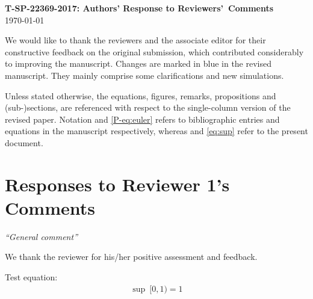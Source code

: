 \documentclass[11pt]{article}
\begin{document}
\begin{center}
\Large \textbf{T-SP-22369-2017: Authors' Response to Reviewers'~Comments}\\
\today
\end{center}
We would like to thank the reviewers and the associate editor for
their constructive feedback on the original submission, which
contributed considerably to improving the manuscript. Changes are
marked in {\color{blue}blue} in the revised manuscript. They mainly
comprise some clarifications and new simulations. 


\noindent Unless stated otherwise, the equations, figures, remarks,
propositions and (sub-)sections, are referenced with respect to the
single-column version of the revised paper. Notation \cite{P-kay1}
and \eqref{P-eq:euler} refers to bibliographic entries and equations in
the manuscript respectively, whereas \cite{kay2} and \eqref{eq:sup}
refer to the present document. 

\section*{Responses to Reviewer 1's Comments}	

{\it ``General comment''}

\vspace*{0.5em} 
We thank the reviewer for
his/her positive assessment and feedback.

Test equation:
\begin{align}
\label{eq:sup}
\sup ~[0,1) = 1
\end{align}
\end{document}
